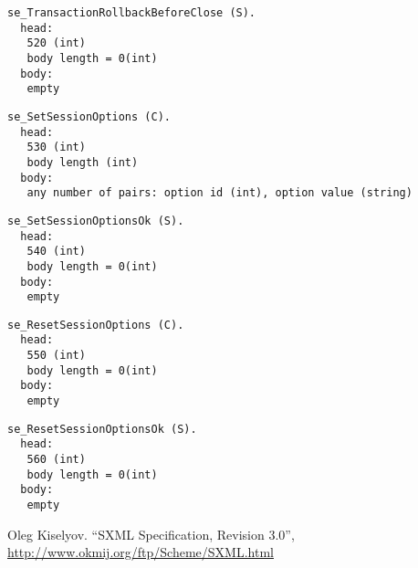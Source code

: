 \documentclass[a4paper,12pt]{article}
\begin{document}
\begin{verbatim}
se_TransactionRollbackBeforeClose (S).
  head:
   520 (int)
   body length = 0(int)
  body:
   empty
\end{verbatim}

\begin{verbatim}
se_SetSessionOptions (C).
  head:
   530 (int)
   body length (int)
  body:
   any number of pairs: option id (int), option value (string)
\end{verbatim}

\begin{verbatim}
se_SetSessionOptionsOk (S).
  head:
   540 (int)
   body length = 0(int)
  body:
   empty
\end{verbatim}

\begin{verbatim}
se_ResetSessionOptions (C).
  head:
   550 (int)
   body length = 0(int)
  body:
   empty
\end{verbatim}

\begin{verbatim}
se_ResetSessionOptionsOk (S).
  head:
   560 (int)
   body length = 0(int)
  body:
   empty
\end{verbatim}

\begin{thebibliography}{1}

Oleg Kiselyov.
``SXML Specification, Revision 3.0'',
\url{http://www.okmij.org/ftp/Scheme/SXML.html}
\end{thebibliography}
\end{document}
